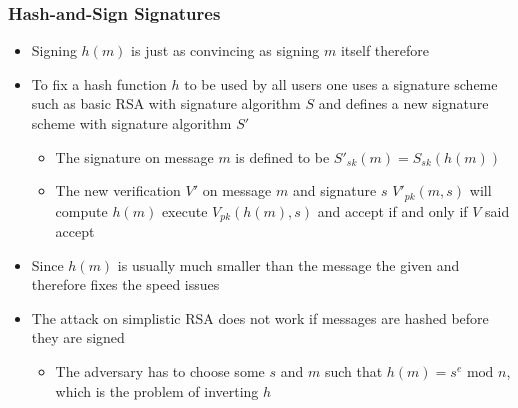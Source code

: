 \documentclass[11pt]{article}
\begin{document}
\subsubsection{Hash-and-Sign Signatures}
\label{sec:orgbcd328a}
\begin{itemize}
\item Signing \(h(m)\) is just as convincing as signing \(m\) itself therefore

\item To fix a hash function \(h\) to be used by all users one uses a signature scheme such as basic RSA with signature algorithm \(S\) and defines a new signature scheme with signature algorithm \(S'\) 
\begin{itemize}
\item The signature on message \(m\) is defined to be \(S'_{sk}(m) = S_{sk}(h(m))\)
\item The new verification \(V'\) on message \(m\) and signature \(s\) \(V'_{pk}(m,s)\) will compute \(h(m)\) execute \(V_{pk}(h(m),s)\) and accept if and only if \(V\) said accept
\end{itemize}

\item Since \(h(m)\) is usually much smaller than the message the given and therefore fixes the speed issues
\item The attack on simplistic RSA does not work if messages are hashed before they are signed
\begin{itemize}
\item The adversary has to choose some \(s\) and \(m\) such that \(h(m) = s^e \text{ mod } n\), which is the problem of inverting \(h\)
\end{itemize}
\end{itemize}
\end{document}

